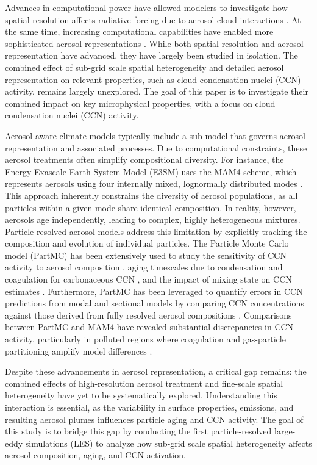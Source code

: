 \documentclass[journal abbreviation, manuscript]{copernicus}
\begin{document}
Advances in computational power have allowed modelers to investigate
how spatial resolution affects radiative forcing due to aerosol-cloud
interactions \citep{ma_how_2015}. At the same time, increasing
computational capabilities have enabled more sophisticated aerosol
representations \citep{zaveri_development_2021,
  tilmes_description_2023}. While both spatial resolution and aerosol
representation have advanced, they have largely been studied in
isolation. The combined effect of sub-grid scale spatial heterogeneity
and detailed aerosol representation on relevant properties, such as
cloud condensation nuclei (CCN) activity, remains largely unexplored.
The goal of this paper is to investigate their combined impact on key 
microphysical properties, with a focus on cloud condensation nuclei 
(CCN) activity.

Aerosol-aware climate models typically include a sub-model that
governs aerosol representation and associated processes. Due to
computational constraints, these aerosol treatments often simplify
compositional diversity. For instance, the Energy Exascale Earth
System Model (E3SM) uses the MAM4 scheme, which represents aerosols
using four internally mixed, lognormally distributed modes
\citep{golaz_doe_2022}. This approach inherently constrains the
diversity of aerosol populations, as all particles within a given mode
share identical composition. In reality, however, aerosols age
independently, leading to complex, highly heterogeneous
mixtures. Particle-resolved aerosol models address this limitation by
explicitly tracking the composition and evolution of individual
particles. The Particle Monte Carlo model (PartMC) \citep{riemer_simulating_2009} 
has been extensively used to study the sensitivity of
CCN activity to aerosol composition \citep{fierce_when_2013}, aging
timescales due to condensation and coagulation for carbonaceous CCN
\citep{fierce_explaining_2015}, and the impact of mixing state on CCN
estimates \citep{ching_metrics_2017}. Furthermore, PartMC has been
leveraged to quantify errors in CCN predictions from modal and
sectional models by comparing CCN concentrations against those derived
from fully resolved aerosol compositions
\citep{zaveri_particle-resolved_2010, ching_metrics_2017}. Comparisons
between PartMC and MAM4 have revealed substantial discrepancies in CCN
activity, particularly in polluted regions where coagulation and
gas-particle partitioning amplify model differences
\citep{fierce_quantifying_2024}.

Despite these advancements in aerosol representation, a critical gap
remains: the combined effects of high-resolution aerosol treatment and
fine-scale spatial heterogeneity have yet to be systematically
explored. Understanding this interaction is essential, as the
variability in surface properties, emissions, and resulting aerosol
plumes influences particle aging and CCN activity. The goal of this
study is to bridge this gap by conducting the first particle-resolved
large-eddy simulations (LES) to analyze how sub-grid scale spatial
heterogeneity affects aerosol composition, aging, and CCN activation.
\end{document}
